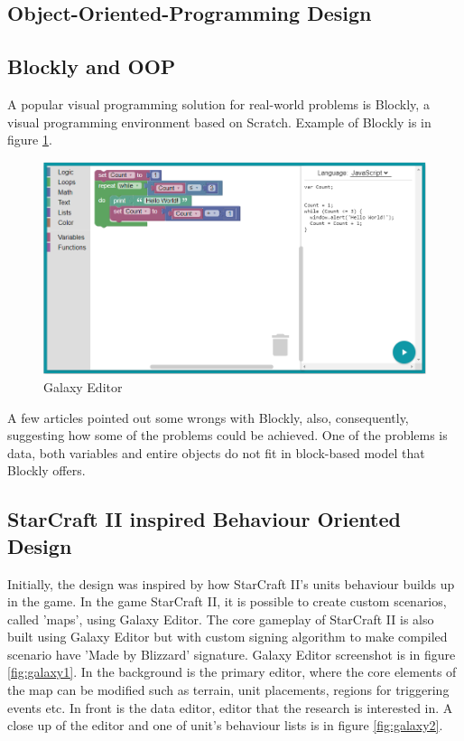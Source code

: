 \documentclass{article}
\begin{document}
\subsection{Object-Oriented-Programming Design}


\subsection{Blockly and OOP}
A popular visual programming solution for real-world problems is Blockly, a visual programming environment based on Scratch. Example of Blockly is in figure \ref*{fig:blockly}.

\begin{figure}[H]
    \centering
    \includegraphics[width=1\textwidth]{blockly.PNG}
    \caption{Galaxy Editor}
    \label{fig:blockly}
\end{figure}


A few articles \cite{7369000, 8120404} pointed out some wrongs with Blockly, also, consequently, suggesting how some of the problems could be achieved. One of the problems is data, both variables and entire objects do not fit in block-based model that Blockly offers.

\cite{8120406}
\cite{1550357}


\subsection{StarCraft II inspired Behaviour Oriented Design}
Initially, the design was inspired by how StarCraft II's units behaviour builds up in the game. In the game StarCraft II, it is possible to create custom scenarios, called 'maps', using Galaxy Editor. The core gameplay of StarCraft II is also built using Galaxy Editor but with custom signing algorithm to make compiled scenario have 'Made by Blizzard' signature.
Galaxy Editor screenshot is in figure \ref*{fig:galaxy1}.
In the background is the primary editor, where the core elements of the map can be modified such as terrain, unit placements, regions for triggering events etc.
In front is the data editor, editor that the research is interested in. A close up of the editor and one of unit's behaviour lists is in figure \ref{fig:galaxy2}.
\end{document}
